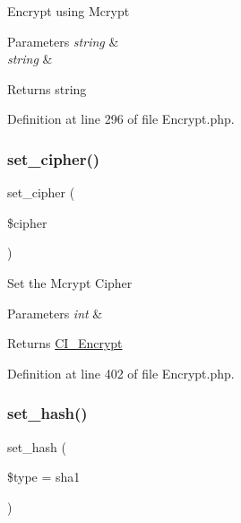 Encrypt using Mcrypt


\begin{DoxyParams}{Parameters}
{\em string} & \\
\hline
{\em string} & \\
\hline
\end{DoxyParams}
\begin{DoxyReturn}{Returns}
string 
\end{DoxyReturn}


Definition at line 296 of file Encrypt.\+php.

\mbox{\label{class_c_i___encrypt_a6459059d757a362410feb13d96455747}} 
\subsubsection{\texorpdfstring{set\_cipher()}{set\_cipher()}}
{\footnotesize\ttfamily set\+\_\+cipher (\begin{DoxyParamCaption}\item[{}]{\$cipher }\end{DoxyParamCaption})}

Set the Mcrypt Cipher


\begin{DoxyParams}{Parameters}
{\em int} & \\
\hline
\end{DoxyParams}
\begin{DoxyReturn}{Returns}
\mbox{\hyperlink{class_c_i___encrypt}{C\+I\+\_\+\+Encrypt}} 
\end{DoxyReturn}


Definition at line 402 of file Encrypt.\+php.

\mbox{\label{class_c_i___encrypt_aa7cef093f6581d1dbeecdf815c7fd8b2}} 
\subsubsection{\texorpdfstring{set\_hash()}{set\_hash()}}
{\footnotesize\ttfamily set\+\_\+hash (\begin{DoxyParamCaption}\item[{}]{\$type = {\ttfamily \textquotesingle{}sha1\textquotesingle{}} }\end{DoxyParamCaption})}

